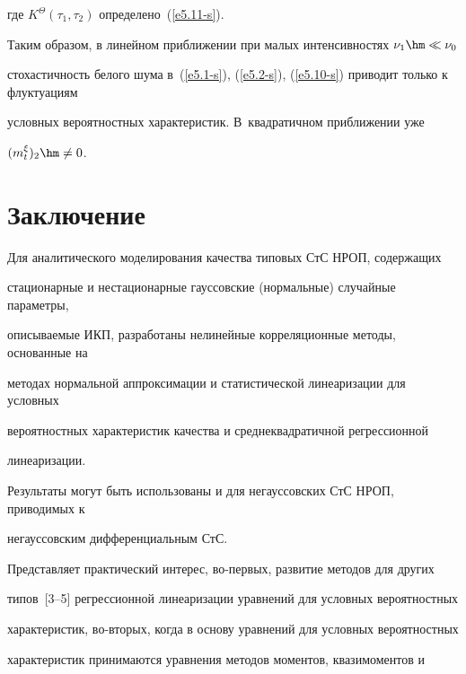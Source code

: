 где $K^\Theta(\tau_1, \tau_2)$ определено~(\ref{e5.11-s}).







Таким образом, в линейном приближении при малых интенсивностях $\nu_1\hm\ll \nu_0$ 

стохастичность  белого шума в~(\ref{e5.1-s}), (\ref{e5.2-s}), (\ref{e5.10-s}) приводит только к флуктуациям 

условных вероятностных характеристик. В~квадратичном приближении уже 

$(m_t^\xi)_2 \hm\ne 0$.



\vspace*{-4pt}





\section{Заключение}



\vspace*{-2pt}



Для аналитического моделирования качества типовых СтС НРОП, содержащих 

стационарные и нестационарные гауссовские (нормальные) случайные параметры, 

описываемые ИКП, разработаны нелинейные корреляционные методы, основанные на 

методах нормальной аппроксимации и статистической линеаризации для условных 

вероятностных характеристик качества и среднеквадратичной регрессионной 

линеаризации.



Результаты могут быть использованы и для негауссовских СтС НРОП, приводимых к 

негауссовским дифференциальным СтС.



Представляет практический интерес, во-пер\-вых, развитие методов для других 

типов~[3--5] регрессионной линеаризации уравнений для условных вероятностных 

характеристик, во-вто\-рых, когда в основу уравнений для условных вероятностных 

характеристик принимаются уравнения методов моментов, квазимоментов и 

